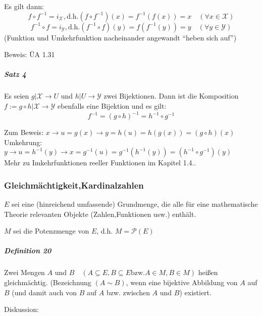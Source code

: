 \documentclass[a4paper]{scrartcl}
\begin{document}
Es gilt dann:
\[f\circ f^{-1} = i_{\mathcal{X}}, \text{d.h.} (f \circ f^{-1})(x) = f^{-1}(f(x))=x \quad (\forall x \in \mathcal{X} )\]
\[f^{-1} \circ f = i_{\mathcal{Y}}, \text{d.h.} (f^{-1} \circ f)(y) = f(f^{-1}(y))=y \quad (\forall y \in \mathcal{Y} )\]
(Funktion und Umkehrfunktion nacheinander angewandt "`heben sich auf"')

Beweis: ÜA 1.31

\subparagraph{Satz 4} Es seien $g|\mathcal{X} \rightarrow U$ und $h|U\rightarrow \mathcal{Y}$ zwei Bijektionen. Dann ist die Komposition $f:= g\circ h | \mathcal{X} \rightarrow \mathcal{Y}$ ebenfalls eine Bijektion und es gilt:
\[f^{-1}=(g\circ h)^{-1} = h^{-1} \circ g^{-1} \]

Zum Beweis: $x \rightarrow u=g(x) \rightarrow y=h(u) = h(g(x)) = (g \circ h)(x)$\\
Umkehrung: $y\rightarrow u = h^{-1}(y) \rightarrow x=g^{-1}(u) =g^{-1}(h^{-1}(y)) = (h^{-1} \circ g^{-1})(y)$\\
Mehr zu Imkehrfunktionen reeller Funktionen im Kapitel 1.4..

\subsubsection{Gleichmächtigkeit,Kardinalzahlen}
$E$ sei eine (hinreichend umfassende) Grundmenge, die alle für eine mathematische Theorie relevanten Objekte (Zahlen,Funktionen usw.) enthält.

$M$ sei die Potenzmenge von $E$, d.h. $M = \mathcal{P} (E)$

\subparagraph{Definition 20} Zwei Mengen $A$ und $B \quad (A \subseteq E, B\subseteq E \text{bzw.} A \in M, B\in M)$ heißen gleichmächtig.
(Bezeichnung $(A \sim B)$, wenn eine bijektive Abbildung von $A$ auf $B$ (und damit auch von $B$ auf $A$ bzw. zwischen $A$ und $B$) existiert.

Diskussion:
\end{document}
